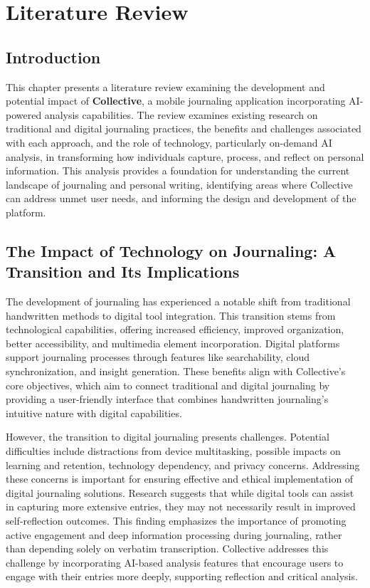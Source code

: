 \chapter{Literature Review}\label{ch:literature}

\section{Introduction}\label{sec:intro}

This chapter presents a literature review examining the development and potential impact of \textbf{Collective}, a mobile journaling application incorporating AI-powered analysis capabilities. The review examines existing research on traditional and digital journaling practices, the benefits and challenges associated with each approach, and the role of technology, particularly on-demand AI analysis, in transforming how individuals capture, process, and reflect on personal information. This analysis provides a foundation for understanding the current landscape of journaling and personal writing, identifying areas where Collective can address unmet user needs, and informing the design and development of the platform.

\section{The Impact of Technology on Journaling: A Transition and Its Implications}\label{sec:technology-impact}

The development of journaling has experienced a notable shift from traditional handwritten methods to digital tool integration. This transition stems from technological capabilities, offering increased efficiency, improved organization, better accessibility, and multimedia element incorporation. Digital platforms support journaling processes through features like searchability, cloud synchronization, and insight generation. These benefits align with Collective's core objectives, which aim to connect traditional and digital journaling by providing a user-friendly interface that combines handwritten journaling's intuitive nature with digital capabilities.

However, the transition to digital journaling presents challenges. Potential difficulties include distractions from device multitasking, possible impacts on learning and retention, technology dependency, and privacy concerns. Addressing these concerns is important for ensuring effective and ethical implementation of digital journaling solutions. Research suggests that while digital tools can assist in capturing more extensive entries, they may not necessarily result in improved self-reflection outcomes. This finding emphasizes the importance of promoting active engagement and deep information processing during journaling, rather than depending solely on verbatim transcription. Collective addresses this challenge by incorporating AI-based analysis features that encourage users to engage with their entries more deeply, supporting reflection and critical analysis.

